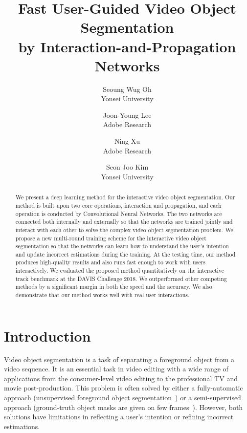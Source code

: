 \documentclass[10pt,twocolumn,letterpaper]{article}
\begin{document}
\title{Fast User-Guided Video Object Segmentation \\ by Interaction-and-Propagation Networks}

\author{
Seoung Wug Oh\\Yonsei University \and Joon-Young Lee\\Adobe Research \and  Ning Xu\\Adobe Research \and  Seon Joo Kim\\Yonsei University
}

\maketitle
\thispagestyle{empty}

\begin{abstract}
We present a deep learning method for the interactive video object segmentation. Our method is built upon two core operations, interaction and propagation, and each operation is conducted by Convolutional Neural Networks. The two networks are connected both internally and externally so that the networks are trained jointly and interact with each other to solve the complex video object segmentation problem. We propose a new multi-round training scheme for the interactive video object segmentation so that the networks can learn how to understand the user's intention and update incorrect estimations during the training. At the testing time, our method produces high-quality results and also runs fast enough to work with users interactively. 
We evaluated the proposed method quantitatively on the interactive track benchmark at the DAVIS Challenge 2018. We outperformed other competing methods by a significant margin in both the speed and the accuracy. We also demonstrate that our method works well with real user interactions. 
\end{abstract}

\section{Introduction}
Video object segmentation is a task of separating a foreground object from a video sequence. It is an essential task in video editing with a wide range of applications from the consumer-level video editing to the professional TV and movie post-production.
This problem is often solved by either a fully-automatic approach (\ie unsupervised foreground object segmentation~\cite{tokmakov2017learning}) or a semi-supervised approach (\ie ground-truth object masks are given on few frames~\cite{caelles2017one, perazzi2017learning}).
However, both solutions have limitations in reflecting a user's intention or refining incorrect estimations.
\end{document}
